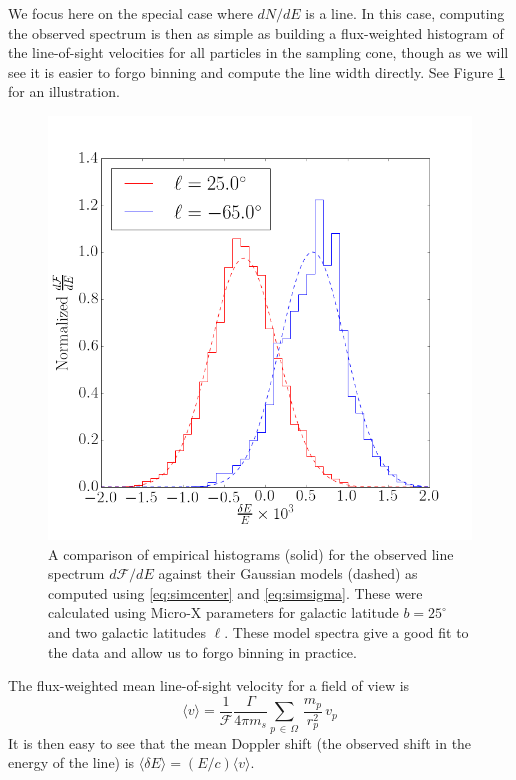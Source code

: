 \documentclass[aps,prl,10pt,twocolumn,superscriptaddress,showpacs]{revtex4-1}
\begin{document}
We focus here on the special case where
$dN/dE$ is a line. In this case, computing the observed spectrum is then as simple as
building a flux-weighted histogram of the line-of-sight velocities for all particles in the sampling cone,
though as we will see it is easier to forgo binning and compute the line width directly. See Figure
\ref{fig:dfde} for an illustration.

\begin{figure}[h!]
\centering
\includegraphics[width=1.0\columnwidth]{dnde_demo.png}
\caption{A comparison of empirical histograms (solid) for the observed line spectrum
	$d\mathcal{F}/dE$ against their Gaussian models (dashed) as computed using \eqref{eq:simcenter} and \eqref{eq:simsigma}.
	These were calculated using Micro-X parameters for galactic latitude $b=25^\circ$ and two galactic
	latitudes $\ell$. These model spectra give a good fit to the data and allow us to forgo
	binning in practice.}
\label{fig:dfde}
\end{figure}

The flux-weighted mean line-of-sight velocity for a field of view is 
\begin{equation} 
	\langle v\rangle =\frac{1}{\mathcal{F}} \frac{\Gamma}{4\pi m_s} \sum_{p \, \in \, \Omega}
	\, \frac{m_p}{r_p^{2}} \, v_p
\label{eq:simcenter}
\end{equation}
It is then easy to see that the mean Doppler shift (the observed shift in the energy of the line) is  
	$\langle \delta E\rangle = (E/c)\langle v \rangle$.
\end{document}
